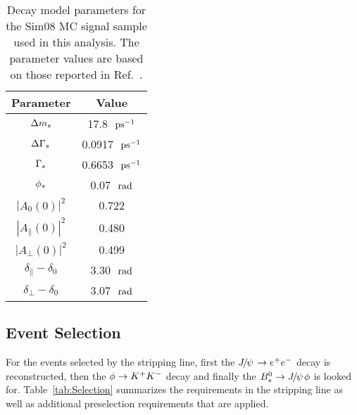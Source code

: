  \begin{table}[hbt]
  \caption{
    Decay model parameters for the Sim08 MC signal sample used in this analysis. The parameter values are based on those reported in Ref.~\cite{Aaij:2013oba}.}
    \small{
\begin{center}\begin{tabular}{cc}
    \hline
    Parameter                         &  Value       \\ 
    \hline
    ${\Delta m_{{s}}}$   &  17.8~${\mathrm{ \,ps^{-1}}}$\\
    ${\Delta\Gamma_{{s}}}$  & 0.0917~${\mathrm{ \,ps^{-1}}}$ \\
    ${\Gamma_{{s}}}$   & 0.6653~${\mathrm{ \,ps^{-1}}}$ \\
    ${\phi_{{s}}}$ & 0.07~$\mathrm{ \,rad}$ \\
    $|A_{0}(0)|^{2}$ & 0.722 \\
    $|A_{\parallel}(0)|^{2}$ & 0.480 \\
    $|A_{\perp}(0)|^{2}$ & 0.499 \\
    $\delta_{\parallel}-\delta_{0}$ & 3.30~$\mathrm{ \,rad}$\\
    $\delta_{\perp}-\delta_{0}$ & 3.07~$\mathrm{ \,rad}$\\
    \hline
  \end{tabular}\end{center}
  }
\label{tab:MCparam}
\end{table}
 
 \subsection{Event Selection}\label{subsec:EvtSel}
 
 For the events selected by the stripping line, first the ${{J\mskip -3mu/\mskip -2mu\psi\mskip 2mu}}\rightarrow{\ensuremath{e^+e^-}}$ decay is reconstructed, then the $\phi\rightarrow{\ensuremath{{K}^+}}{\ensuremath{{K}^-}}$ decay and finally the ${{B}^0_{s}}\rightarrow{\ensuremath{{J\mskip -3mu/\mskip -2mu\psi\mskip 2mu}}}\phi$ is looked for.
 Table~\ref{tab:Selection} summarizes the requirements in the stripping line as well as additional preselection requirements that are applied.

